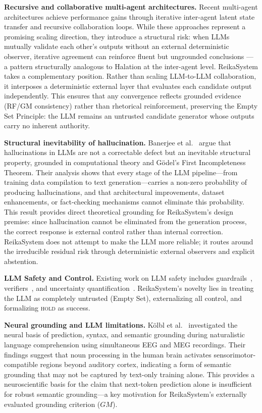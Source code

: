 \documentclass[11pt,a4paper]{article}
\begin{document}
\textbf{Recursive and collaborative multi-agent architectures.}
Recent multi-agent architectures achieve performance gains through iterative
inter-agent latent state transfer and recursive collaboration loops.
While these approaches represent a promising scaling direction, they introduce a
structural risk: when LLMs mutually validate each other's outputs without an external
deterministic observer, iterative agreement can reinforce fluent but ungrounded
conclusions --- a pattern structurally analogous to Halation at the inter-agent level.
ReikaSystem takes a complementary position. Rather than scaling LLM-to-LLM
collaboration, it interposes a deterministic external layer that evaluates each
candidate output independently. This ensures that any convergence reflects grounded
evidence (RF/GM consistency) rather than rhetorical reinforcement, preserving the
Empty Set Principle: the LLM remains an untrusted candidate generator whose outputs
carry no inherent authority.

\textbf{Structural inevitability of hallucination.}
Banerjee et al.~\cite{banerjee2024hallucinate} argue that hallucinations in LLMs
are not a correctable defect but an inevitable structural property, grounded in
computational theory and G\"{o}del's First Incompleteness Theorem.
Their analysis shows that every stage of the LLM pipeline---from training data
compilation to text generation---carries a non-zero probability of producing
hallucinations, and that architectural improvements, dataset enhancements, or
fact-checking mechanisms cannot eliminate this probability.
This result provides direct theoretical grounding for ReikaSystem's design
premise: since hallucination cannot be eliminated from the generation process,
the correct response is external control rather than internal correction.
ReikaSystem does not attempt to make the LLM more reliable; it routes around
the irreducible residual risk through deterministic external observers and
explicit abstention.

\textbf{LLM Safety and Control.} Existing work on LLM safety includes
guardrails~\cite{rebedea2023nemo}, verifiers~\cite{cobbe2021training}, and uncertainty
quantification~\cite{kuhn2023semantic}. ReikaSystem's novelty lies in treating the LLM as
completely untrusted (Empty Set), externalizing all control, and formalizing \textsc{hold}
as success.

\textbf{Neural grounding and LLM limitations.}
K\"{o}lbl et al.~\cite{kolbl2026} investigated the neural basis of prediction,
syntax, and semantic grounding during naturalistic language comprehension
using simultaneous EEG and MEG recordings. Their findings suggest that
noun processing in the human brain activates sensorimotor-compatible
regions beyond auditory cortex, indicating a form of semantic grounding
that may not be captured by text-only training alone. This provides a
neuroscientific basis for the claim that next-token prediction alone is
insufficient for robust semantic grounding---a key motivation for
ReikaSystem's externally evaluated grounding criterion ($GM$).
\end{document}
